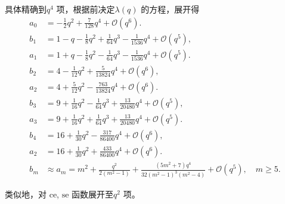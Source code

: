 具体精确到\(q^4\) 项，根据前决定\(\lambda(q)\) 的方程，展开得
\begin{align*}
	a_0 & = -\frac{1}{2}q^2 + \frac{7}{128}q^4 + \mathcal{O}(q^6).                                                                      \\
	b_1 & = 1 - q - \frac{1}{8}q^2 + \frac{1}{64}q^3 - \frac{1}{1536}q^4 + \mathcal{O}(q^5),                                            \\
	a_1 & = 1 + q - \frac{1}{8}q^2 - \frac{1}{64}q^3 - \frac{1}{1536}q^4 + \mathcal{O}(q^5).                                            \\
	b_2 & = 4 - \frac{1}{12}q^2 + \frac{5}{13824}q^4 + \mathcal{O}(q^6),                                                                \\
	a_2 & = 4 + \frac{5}{12}q^2 - \frac{763}{13824}q^4 + \mathcal{O}(q^6).                                                              \\
	b_3 & = 9 + \frac{1}{16}q^2 - \frac{1}{64}q^3 + \frac{13}{20480}q^4 + \mathcal{O}(q^5),                                             \\
	a_3 & = 9 + \frac{1}{16}q^2 + \frac{1}{64}q^3 + \frac{13}{20480}q^4 + \mathcal{O}(q^5).                                             \\
	b_4 & = 16 + \frac{1}{30}q^2 - \frac{317}{86400}q^4 + \mathcal{O}(q^6),                                                             \\
	a_2 & = 16 + \frac{1}{30}q^2 + \frac{433}{86400}q^4 + \mathcal{O}(q^6).                                                             \\
	b_m & \approx a_m = m^2 + \frac{q^2}{2(m^2 - 1)} + \frac{(5m^2 + 7)q^4}{32(m^2 - 1)^3(m^2 - 4)} + \mathcal{O}(q^5), \quad m \geq 5.
\end{align*}

类似地，对 \(\mathrm{ce}\), \(\mathrm{se}\) 函数展开至\(q^2\) 项。

